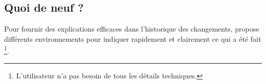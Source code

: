 \documentclass[10pt, a4paper]{article}
\begin{document}

\subsection{Quoi de neuf ?}

Pour fournir des explications efficaces dans l'historique des changements,  propose différents environnements pour indiquer rapidement et clairement ce qui a été fait
\footnote{
	L'utilisateur n'a pas besoin de tous les détails techniques.
}.


\begin{bdocexa}
	\leavevmode
	
\end{bdocexa}




\begin{bdocexa}
	\leavevmode

\end{bdocexa}




\begin{bdocexa}
	\leavevmode

\end{bdocexa}




\begin{bdocexa}
	\leavevmode

\end{bdocexa}
\end{document}
